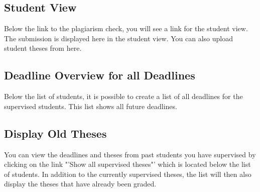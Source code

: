 \subsection{Student View}
Below the link to the plagiarism check, you will see a link for the student view.
The submission is displayed here in the student view. You can also upload student theses from here.

\subsection{Deadline Overview for all Deadlines}
Below the list of students, it is possible to create a list of all deadlines for the supervised students. This list shows all future deadlines.

\subsection{Display Old Theses}
You can view the deadlines and theses from past students you have supervised by clicking on the link "'Show all supervised theses"' which is located below the list of students. In addition to the currently supervised theses, the list will then also display the theses that have already been graded.
